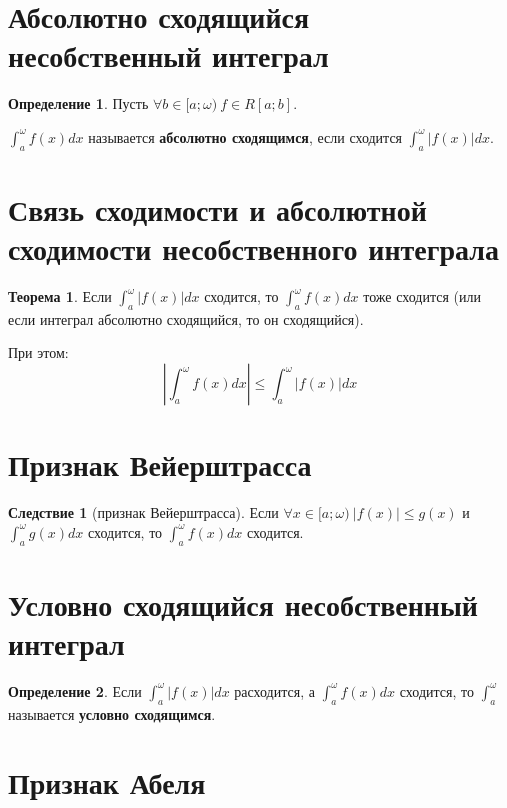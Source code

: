 \documentclass{report}
\theoremstyle{definition}
\newtheorem*{definition}{Определение}
\newtheorem*{effect}{Следствие}
\newtheorem*{theorem}{Теорема}
\begin{document}
\section{Абсолютно сходящийся несобственный интеграл}

\begin{definition}
    Пусть $\forall b \in [a;\omega) \ f\in R[a;b]$.

    $\int_{a}^{\omega}f(x)dx$ называется \textbf{абсолютно сходящимся}, если сходится $\int_{a}^{\omega}|f(x)|dx$.
\end{definition}

\section{Связь сходимости и абсолютной сходимости несобственного интеграла}

\begin{theorem}
    Если $\int_{a}^{\omega}| f(x) |dx$ сходится, то $\int_{a}^{\omega}f(x)dx$ тоже сходится (или если интеграл
    абсолютно сходящийся, то он сходящийся).

    При этом:
    \begin{equation*}
        | \int_{a}^{\omega}f(x)dx | \leqslant \int_{a}^{\omega}| f(x) |dx
    \end{equation*}
\end{theorem}

\section{Признак Вейерштрасса}

\begin{effect}[признак Вейерштрасса]
    Если $\forall x \in [a;\omega) \ | f(x) | \leqslant g(x)$ и $\int_{a}^{\omega}g(x)dx$ сходится, то
    $\int_{a}^{\omega}f(x)dx$ сходится.
\end{effect}

\section{Условно сходящийся несобственный интеграл}

\begin{definition}
    Если $\int_{a}^{\omega}| f(x) |dx$ расходится, а $\int_{a}^{\omega}f(x)dx$ сходится, то $\int_{a}^{\omega}$
    называется \textbf{условно сходящимся}.
\end{definition}

\section{Признак Абеля}
\end{document}
